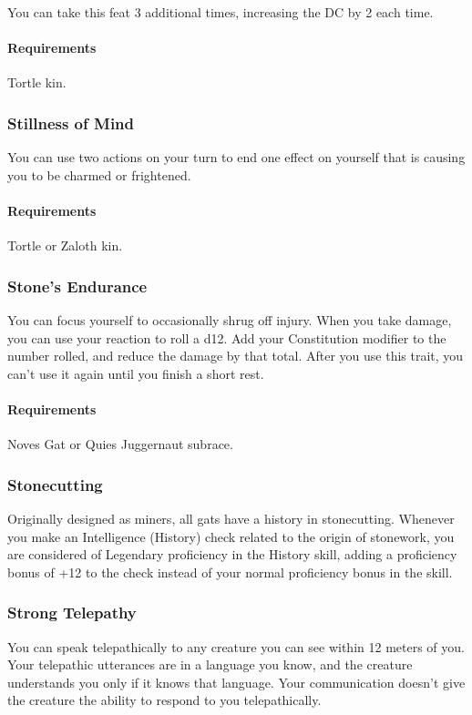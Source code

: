     You can take this feat 3 additional times, increasing the DC by 2 each time.
    \paragraph{Requirements} Tortle kin.
\subsubsection{Stillness of Mind} \label{feat::stillnessofmind}
    You can use two actions on your turn to end one effect on yourself that is causing you to be charmed or frightened.
    \paragraph{Requirements} Tortle or Zaloth kin.
\subsubsection{Stone's Endurance} \label{feat::stonesendurance}
    You can focus yourself to occasionally shrug off injury.
    When you take damage, you can use your reaction to roll a d12.
    Add your Constitution modifier to the number rolled, and reduce the damage by that total.
    After you use this trait, you can't use it again until you finish a short rest.
    \paragraph{Requirements} Noves Gat or Quies Juggernaut subrace.
\subsubsection{Stonecutting} \label{feat::stonecutting}
    Originally designed as miners, all gats have a history in stonecutting.
    Whenever you make an Intelligence (History) check related to the origin of stonework, you are considered of Legendary proficiency in the History skill, adding a proficiency bonus of +12 to the check instead of your normal proficiency bonus in the skill.
\subsubsection{Strong Telepathy} \label{feat::strongtelepathy}
    You can speak telepathically to any creature you can see within 12 meters of you.
    Your telepathic utterances are in a language you know, and the creature understands you only if it knows that language.
    Your communication doesn't give the creature the ability to respond to you telepathically.

